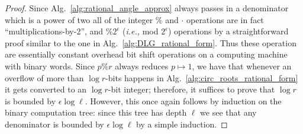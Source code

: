 \documentclass[runningheads]{llncs}
\begin{document}
\begin{proof}
  Since Alg.~\ref{alg:rational_angle_approx} always passes in a denominator which is a power of two all of the integer $\%$ and $\cdot$ operations are in fact ``multiplications-by-2'', and $ \%2^\epsilon $ (\emph{i.e.,} mod $ 2^\epsilon $) operations by a straightforward proof similar to the one in Alg.~\ref{alg:DLG_rational_form}. Thus these operation are essentially constant overhead bit shift operations on a computing machine with binary words. Since $p\% r$ always reduces $p \mapsto 1$, we have that whenever an overflow of more than $\log r$-bits happens in Alg.~\ref{alg:circ_roots_rational_form} it gets converted to an $\log r$-bit integer; therefore, it suffices to prove that $\log r$ is bounded by  $\epsilon \log \ell $. However, this once again follows by induction on the binary computation tree: since this tree has depth $\ell$ we see that any denominator is bounded by $\epsilon \log \ell $ by a simple induction.
\end{proof}
\end{document}
